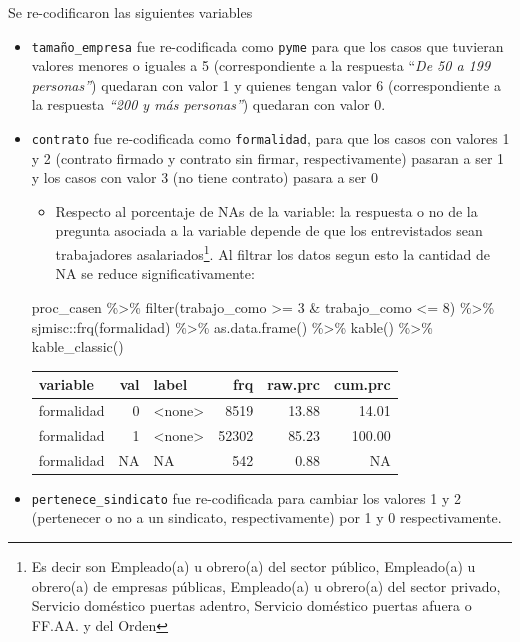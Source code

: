 \documentclass[
  a4paper,
  oneside]{scrbook}
\newenvironment{Shaded}{\begin{snugshade}}{\end{snugshade}}
\newcommand{\DecValTok}[1]{\textcolor[rgb]{0.68,0.00,0.00}{#1}}
\newcommand{\FunctionTok}[1]{\textcolor[rgb]{0.28,0.35,0.67}{#1}}
\newcommand{\NormalTok}[1]{\textcolor[rgb]{0.00,0.23,0.31}{#1}}
\newcommand{\SpecialCharTok}[1]{\textcolor[rgb]{0.37,0.37,0.37}{#1}}
\providecommand{\tightlist}{%
  \setlength{\itemsep}{0pt}\setlength{\parskip}{0pt}}\usepackage{longtable,booktabs,array}
\begin{document}
Se re-codificaron las siguientes variables

\begin{itemize}
\item
  \texttt{tamaño\_empresa} fue re-codificada como \texttt{pyme} para que
  los casos que tuvieran valores menores o iguales a 5 (correspondiente
  a la respuesta ``\emph{De 50 a 199 personas''}) quedaran con valor 1 y
  quienes tengan valor 6 (correspondiente a la respuesta \emph{``200 y
  más personas''}) quedaran con valor 0.
\item
  \texttt{contrato} fue re-codificada como \texttt{formalidad}, para que
  los casos con valores 1 y 2 (contrato firmado y contrato sin firmar,
  respectivamente) pasaran a ser 1 y los casos con valor 3 (no tiene
  contrato) pasara a ser 0

  \begin{itemize}
  \tightlist
  \item
    Respecto al porcentaje de NAs de la variable: la respuesta o no de
    la pregunta asociada a la variable depende de que los entrevistados
    sean trabajadores asalariados\footnote{Es decir son Empleado(a) u
      obrero(a) del sector público, Empleado(a) u obrero(a) de empresas
      públicas, Empleado(a) u obrero(a) del sector privado, Servicio
      doméstico puertas adentro, Servicio doméstico puertas afuera o
      FF.AA. y del Orden}. Al filtrar los datos segun esto la cantidad
    de NA se reduce significativamente:
  \end{itemize}

\begin{Shaded}
\begin{Highlighting}[]
\NormalTok{proc\_casen }\SpecialCharTok{\%\textgreater{}\%}
  \FunctionTok{filter}\NormalTok{(trabajo\_como }\SpecialCharTok{\textgreater{}=} \DecValTok{3} \SpecialCharTok{\&}\NormalTok{ trabajo\_como }\SpecialCharTok{\textless{}=} \DecValTok{8}\NormalTok{) }\SpecialCharTok{\%\textgreater{}\%}
\NormalTok{  sjmisc}\SpecialCharTok{::}\FunctionTok{frq}\NormalTok{(formalidad) }\SpecialCharTok{\%\textgreater{}\%} \FunctionTok{as.data.frame}\NormalTok{() }\SpecialCharTok{\%\textgreater{}\%}
  \FunctionTok{kable}\NormalTok{() }\SpecialCharTok{\%\textgreater{}\%} \FunctionTok{kable\_classic}\NormalTok{()}
\end{Highlighting}
\end{Shaded}

  \begin{longtable*}[t]{lrlrrr}
  \toprule
  variable & val & label & frq & raw.prc & cum.prc\\
  \midrule
  formalidad & 0 & <none> & 8519 & 13.88 & 14.01\\
  formalidad & 1 & <none> & 52302 & 85.23 & 100.00\\
  formalidad & NA & NA & 542 & 0.88 & NA\\
  \bottomrule
  \end{longtable*}
\item
  \texttt{pertenece\_sindicato} fue re-codificada para cambiar los
  valores 1 y 2 (pertenecer o no a un sindicato, respectivamente) por 1
  y 0 respectivamente.
\end{itemize}
\end{document}
